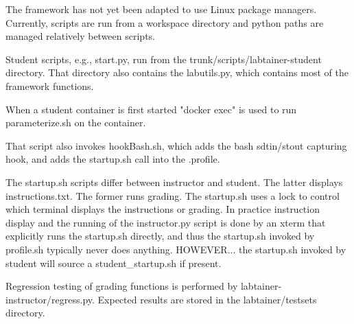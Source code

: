 The framework has not yet been adapted to use Linux package managers.
Currently, scripts are run from a workspace directory and python
paths are managed relatively between scripts.  

Student scripts, e.g., start.py, run from the trunk/scripts/labtainer-student directory.
That directory also contains the labutils.py, which contains most of the framework
functions.

When a student container is first started "docker exec" is used
to run parameterize.sh on the container.

That script also invokes hookBash.sh, which adds the bash
sdtin/stout capturing hook, and adds the startup.sh call
into the .profile.

The startup.sh scripts differ between instructor and student.  The latter
displays instructions.txt.  The former runs grading.
The startup.sh uses a lock to control which
terminal displays the instructions or grading.  In practice instruction
display and the running of the instructor.py script is done by
an xterm that explicitly runs the startup.sh directly, and thus
the startup.sh invoked by profile.sh typically never does anything.
HOWEVER... the startup.sh invoked by student will source a student_startup.sh if present.



Regression testing of grading functions is performed by labtainer-instructor/regress.py.
Expected results are stored in the labtainer/testsets directory.

